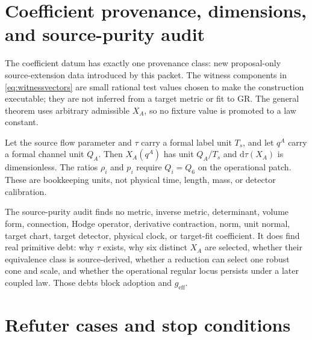 \documentclass[11pt]{article}
\newcommand{\dd}{\mathrm d}
\begin{document}
\section{Coefficient provenance, dimensions, and source-purity audit}

The coefficient datum has exactly one provenance class: new proposal-only
source-extension data introduced by this packet.  The witness components in
\eqref{eq:witnessvectors} are small rational test values chosen to make the
construction executable; they are not inferred from a target metric or fit to
GR.  The general theorem uses arbitrary admissible $X_A$, so no fixture value
is promoted to a law constant.

Let the source flow parameter and $\tau$ carry a formal label unit $T_s$, and
let $q^A$ carry a formal channel unit $Q_A$.  Then $X_A(q^A)$ has unit
$Q_A/T_s$ and $\dd\tau(X_A)$ is dimensionless.  The ratios $\rho_i$ and
$p_i$ require $Q_i=Q_6$ on the operational patch.  These are bookkeeping
units, not physical time, length, mass, or detector calibration.

The source-purity audit finds no metric, inverse metric, determinant, volume
form, connection, Hodge operator, derivative contraction, norm, unit normal,
target chart, target detector, physical clock, or target-fit coefficient.
It does find real primitive debt: why $\tau$ exists, why six distinct $X_A$
are selected, whether their equivalence class is source-derived, whether a
reduction can select one robust cone and scale, and whether the operational
regular locus persists under a later coupled law.  Those debts block adoption
and $g_{\mathrm{eff}}$.

\section{Refuter cases and stop conditions}
\end{document}
